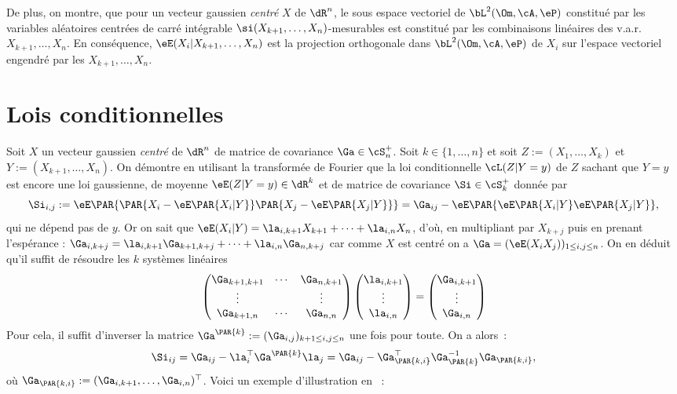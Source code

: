 De plus, on montre, que pour un vecteur gaussien \emph{centré} $X$ de $\dR^n$,
le sous espace vectoriel de $\bL^2(\Om,\cA,\eP)$ constitué par les variables
aléatoires centrées de carré intégrable $\si(X_{k+1},\ldots,X_n)$-mesurables
est constitué par les combinaisons linéaires des v.a.r. $X_{k+1},\ldots,X_n$.
En conséquence, $\eE(X_i\vert X_{k+1},\ldots,X_n)$ est la projection
orthogonale dans $\bL^2(\Om,\cA,\eP)$ de $X_i$ sur l'espace vectoriel engendré
par les $X_{k+1},\ldots,X_n$.

\section{Lois conditionnelles}

Soit $X$ un vecteur gaussien \emph{centré} de $\dR^n$ de matrice de covariance
$\Ga\in\cS_n^+$. Soit $k\in\{1,\ldots,n\}$ et soit $Z:=(X_1,\ldots,X_k)$ et
$Y:=(X_{k+1},\ldots,X_n)$. On démontre en utilisant la transformée de Fourier
que la loi conditionnelle $\cL(Z\vert Y=y)$ de $Z$ sachant que $Y=y$ est
encore une loi gaussienne, de moyenne $\eE(Z\vert Y=y)\in\dR^k$ et de matrice
de covariance $\Si\in\cS^+_k$ donnée par
$$
\Si_{i,j}:=\eE\PAR{\PAR{X_i-\eE\PAR{X_i\vert Y}}\PAR{X_j-\eE\PAR{X_j\vert
      Y}}} = \Ga_{ij}-\eE\PAR{\eE\PAR{X_i\vert Y}\eE\PAR{X_j\vert Y}},
$$
qui ne dépend pas de $y$. Or on sait que $\eE(X_i\vert Y)=\la_{i,k+1}
X_{k+1}+\cdots+\la_{i,n} X_n$, d'où, en multipliant par $X_{k+j}$ puis en
prenant l'espérance : $\Ga_{i,k+j}=\la_{i,k+1} \Ga_{k+1,k+j}+\cdots+\la_{i,n}
\Ga_{n,k+j}$ car comme $X$ est centré on a $\Ga=(\eE(X_i X_j))_{1\leq i,j \leq
  n}$. On en déduit qu'il suffit de résoudre les $k$ systèmes linéaires
$$
\begin{pmatrix} \Ga_{k+1,k+1} & \cdots & \Ga_{n,k+1} \\ 
                \vdots        &        & \vdots \\ 
                \Ga_{k+1,n}   & \cdots & \Ga_{n,n}
\end{pmatrix}
\begin{pmatrix} \la_{i,k+1} \\ \vdots \\ \la_{i,n}\end{pmatrix} 
=\begin{pmatrix} \Ga_{i,k+1} \\ \vdots \\ \Ga_{i,n}\end{pmatrix}
$$
Pour cela, il suffit d'inverser la matrice
$\Ga^{\PAR{k}}:=(\Ga_{i,j})_{k+1\leq i,j \leq n}$ une fois pour toute. On a
alors~:
$$
\Si_{ij}=\Ga_{ij}-\la_i^\top\Ga^\PAR{k}\la_j
        =\Ga_{ij}-\Ga_\PAR{k,i}^\top \Ga_\PAR{k}^{-1} \Ga_\PAR{k,i},
$$
où $\Ga_\PAR{k,i}:=(\Ga_{i,k+1},\ldots,\Ga_{i,n})^\top$. Voici un
exemple d'illustration en \ML{}~:
%
%
%

